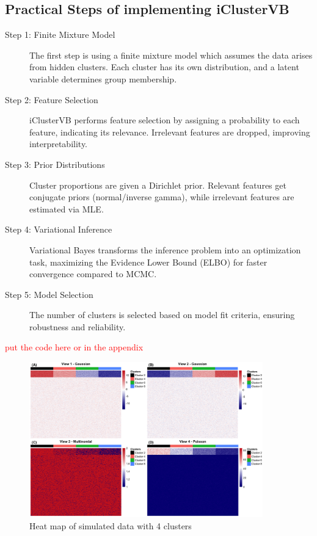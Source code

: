 \subsection{Practical Steps of implementing iClusterVB}

\begin{description}
  \item[Step 1: Finite Mixture Model] 
  The first step is using a finite mixture model which assumes the data arises from hidden clusters. Each cluster has its own distribution, and a latent variable determines group membership.

  \item[Step 2: Feature Selection] 
  iClusterVB performs feature selection by assigning a probability to each feature, indicating its relevance. Irrelevant features are dropped, improving interpretability.

  \item[Step 3: Prior Distributions] 
  Cluster proportions are given a Dirichlet prior. Relevant features get conjugate priors (normal/inverse gamma), while irrelevant features are estimated via MLE.

  \item[Step 4: Variational Inference] 
  Variational Bayes transforms the inference problem into an optimization task, maximizing the Evidence Lower Bound (ELBO) for faster convergence compared to MCMC.

  \item[Step 5: Model Selection] 
  The number of clusters is selected based on model fit criteria, ensuring robustness and reliability.
\end{description}

\textcolor{red}{put the code here or in the appendix}

\begin{figure}[!h]
\centering
\includegraphics[width=0.9\textwidth]{../results/Simulated_heatmap.png}
\caption{Heat map of simulated data with 4 clusters}
\label{fig:simulated_heatmap}
\end{figure}